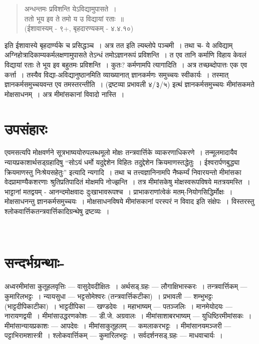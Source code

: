 {\begin{verse}
अन्धन्तमः प्रविशन्ति येऽविद्यामुपासते~। \\
ततो भूय इव ते तमो य उ विद्यायां रताः~॥\\
\hspace{3cm}(ईशावास्यम् - ९+, बृहदारण्यकम् - ४.४.१०)
\end{verse}
इति ईशावास्ये बृहदार्ण्यके च प्रसिद्धञ्च~। अत्र तत इति ल्यब्लोपे पञ्चमी~। तथा च- ये अविद्याम् अग्निहोत्रादिकाम्यकर्मलक्षणामुपासते तेऽन्धं तमोऽज्ञानरूपं प्रविशन्ति~। त एव तानि कर्माणि विहाय केवलं विद्यायां रताः ते भूय इव बहुतमः प्रविशन्ति~। कुतः? कर्मणामपि त्यागादिति~। अत्र तच्छब्दोपात्तः एक एव कर्त्ता~। तस्यैव विद्या-अविद्यानुष्ठानमिति व्याख्यानात् ज्ञानकर्मणः समुच्चयः स्वीकार्यः~। तस्मात् ज्ञानकर्मसमुच्चयवन्त एव तमस्तरन्तीति~। (द्रष्टव्या प्रभावली ४/३/५) इत्थं ज्ञानकर्मसमुच्चयः मीमांसकमते मोक्षसाधनम्~। अत्र मीमांसकानां विवादो नास्ति~। 

\section*{उपसंहारः}

एवमसत्यपि मोक्षवर्णने सूत्रभाष्ययोरुपलब्धमूलो मोक्षः तन्त्रवार्त्तिके व्याकरणाधिकरणे~। तन्मूलमादायैव न्यायप्रकाशार्थसड्ग्रहादिषु “सोऽयं धर्मो यदुद्देशेन विहितः तदु्द्देशेन क्रियमाणस्तद्धेतुः~। ईश्वरार्पणबुद्ध्या क्रियमाणस्तु निःश्रेयसहेतुः” इत्यादि न्यगादि~। तथा च तत्त्वज्ञानिनामपि नैष्कर्म्यं निवारयन्तो मीमांसका वेदप्रामाण्यैकशरणाः श्रुतिप्रतिपादितं मोक्षमपि नोज्झन्ति~। तत्र मीमांसकेषु मोक्षस्वरूपविषये मतत्रयमस्ति~। भाट्टानां मतद्वयम् - आनन्दमोक्षवादः दुःखाभावरूपश्च~। प्राभाकराणांत्वेकं मतम्-नियोगसिद्धिर्मोक्षः~। मोक्षसाधनन्तु ज्ञानकर्मसमुच्चयः~। मोक्षसाधनविषये मीमांसकानां परस्परं न विवाद इति संक्षेपः~। विस्तरस्तु श्लोकवार्त्तिकतन्त्रवार्त्तिकादिग्रन्थेषु द्रष्टव्यः~। 

~\\[-1cm]
 
\section*{सन्दर्भग्रन्थाः-} 
\vskip -1cm
 
\begin{thebibliography}{99}
\itemsep=0pt
 अध्वरमीमांसा कुतूहलवृत्तिः --- वासुदेवदीक्षितः~। 
 अर्थसड्.ग्रहः --- लौगाक्षिभास्करः~। 
 तन्त्रवार्त्तिकम् --- कुमारिलभट्टः~। 
 न्यायसुधा --- भट्टसोमेश्वरः (तन्त्रवार्त्तिकटीका)~। 
 प्रभावली --- शम्भुभट्टः (भाट्टदीपिकाटीका)~। 
 भाट्टदीपिका --- खण्डदेवः~। 
 महाभाष्यम् --- पतञ्जलिः~। 
 मानमेयोदयः --- नारायणद्वयी~। 
 मीमांसाउद्धरणकोशः --- डी.जे. अग्रवालः~। 
 मीमांसाशाबरभाष्यम् --- युधिष्ठिरमीमांसकः~। 
 मीमांसान्यायप्रकाशः --- आपदेवः~। 
 मीमांसाकुतूहलम् --- कमलाकरभट्टः~। 
 मीमांसानयमञ्जरी --- पट्टाभिरामशास्त्री~। 
 श्लोकवार्त्तिकम् --- कुमारिलभट्टः~। 
 सर्वदर्शनसड्.ग्रहः --- माधवाचार्यः~। 
\end{thebibliography}

\articleend
}
